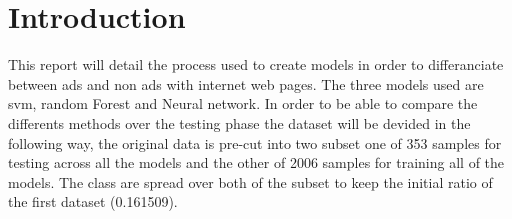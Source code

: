 \chapter{Introduction}

This report will detail the process used to create models in order to differanciate between ads and non ads with internet web pages. The three models used are svm, random Forest and Neural network.
In order to be able to compare the differents methods over the testing phase the dataset will be devided in the following way, the original data is pre-cut into two subset one of 353 samples for testing across all the models and the other of 2006 samples for training all of the models. The class are spread over both of the subset to keep the initial ratio of the first dataset (0.161509).
